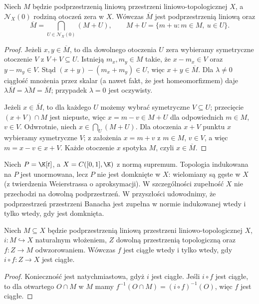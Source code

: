 \begin{lemat}\label{lem:closure-subspace}
Niech $M$ będzie podprzestrzenią liniową przestrzeni
liniowo-topologicznej $X$, a $\mathcal N_X(0)$ rodziną
otoczeń zera w $X$. Wówczas $\overline M$ jest podprzestrzenią
liniową oraz
\[
 \overline M=\bigcap_{U\in\mathcal N_X(0)}(M+U),
 \qquad M+U=\{m+u:m\in M,\ u\in U\}.
\]
\end{lemat}
\begin{proof}
Jeżeli $x,y\in\overline M$, to dla dowolnego otoczenia $U$
zera wybieramy symetryczne otoczenie $V$ z $V+V\subseteq U$.
Istnieją $m_x,m_y\in M$ takie, że $x-m_x\in V$ oraz
$y-m_y\in V$. Stąd $(x+y)-(m_x+m_y)\in U$,
więc $x+y\in\overline M$. Dla $\lambda\ne0$ ciągłość
mnożenia przez skalar (a nawet fakt, że jest homeomorfizmem)
daje $\lambda\overline M=\overline{\lambda M}=\overline M$;
przypadek $\lambda=0$ jest oczywisty.

Jeżeli $x\in\overline M$, to dla każdego $U$ możemy wybrać
symetryczne $V\subseteq U$; przecięcie $(x+V)\cap M$
jest niepuste, więc $x=m-v\in M+U$ dla odpowiednich
$m\in M$, $v\in V$. Odwrotnie, niech $x\in\bigcap_U(M+U)$.
Dla otoczenia $x+V$ punktu $x$ wybieramy symetryczne $V$;
z założenia $x=m+v$ z $m\in M$, $v\in V$,
a więc $m=x-v\in x+V$. Każde otoczenie $x$ spotyka $M$,
czyli $x\in\overline M$.
\end{proof}

\begin{przyklad}
Niech $P=\K[t]$, a $X=C([0,1],\K)$ z normą supremum.
Topologia indukowana na $P$ jest unormowana, lecz $P$
nie jest domknięte w $X$: wielomiany są gęste w $X$
(z twierdzenia Weierstrassa o aproksymacji). W szczególności
zupełność $X$ nie przechodzi na dowolną podprzestrzeń.
W przyszłości udowodnimy, że podprzestrzeń przestrzeni Banacha
jest zupełna w normie indukowanej wtedy i tylko wtedy, gdy
jest domknięta.
\end{przyklad}

\begin{stwierdzenie}
Niech $M\subseteq X$ będzie podprzestrzenią liniową przestrzeni
liniowo-topologicznej $X$, $i:M\hookrightarrow X$ naturalnym
włożeniem, $Z$ dowolną przestrzenią topologiczną oraz
$f:Z\to M$ odwzorowaniem. Wówczas $f$ jest ciągłe
wtedy i tylko wtedy, gdy $i\circ f:Z\to X$ jest ciągłe.
\end{stwierdzenie}
\begin{proof}
Konieczność jest natychmiastowa, gdyż $i$ jest ciągłe.
Jeśli $i\circ f$ jest ciągłe, to dla otwartego $O\cap M$
w $M$ mamy $f^{-1}(O\cap M)=(i\circ f)^{-1}(O)$,
więc $f$ jest ciągłe.
\end{proof}

